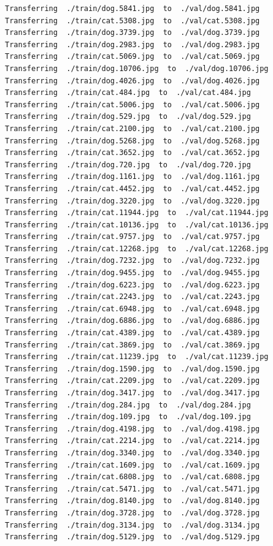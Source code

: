 \documentclass[]{book}
\theoremstyle{definition}
\theoremstyle{definition}
\theoremstyle{definition}
\theoremstyle{remark}
\begin{document}
\begin{verbatim}
Transferring  ./train/dog.5841.jpg  to  ./val/dog.5841.jpg
Transferring  ./train/cat.5308.jpg  to  ./val/cat.5308.jpg
Transferring  ./train/dog.3739.jpg  to  ./val/dog.3739.jpg
Transferring  ./train/dog.2983.jpg  to  ./val/dog.2983.jpg
Transferring  ./train/cat.5069.jpg  to  ./val/cat.5069.jpg
Transferring  ./train/dog.10706.jpg  to  ./val/dog.10706.jpg
Transferring  ./train/dog.4026.jpg  to  ./val/dog.4026.jpg
Transferring  ./train/cat.484.jpg  to  ./val/cat.484.jpg
Transferring  ./train/cat.5006.jpg  to  ./val/cat.5006.jpg
Transferring  ./train/dog.529.jpg  to  ./val/dog.529.jpg
Transferring  ./train/cat.2100.jpg  to  ./val/cat.2100.jpg
Transferring  ./train/dog.5268.jpg  to  ./val/dog.5268.jpg
Transferring  ./train/cat.3652.jpg  to  ./val/cat.3652.jpg
Transferring  ./train/dog.720.jpg  to  ./val/dog.720.jpg
Transferring  ./train/dog.1161.jpg  to  ./val/dog.1161.jpg
Transferring  ./train/cat.4452.jpg  to  ./val/cat.4452.jpg
Transferring  ./train/dog.3220.jpg  to  ./val/dog.3220.jpg
Transferring  ./train/cat.11944.jpg  to  ./val/cat.11944.jpg
Transferring  ./train/cat.10136.jpg  to  ./val/cat.10136.jpg
Transferring  ./train/cat.9757.jpg  to  ./val/cat.9757.jpg
Transferring  ./train/cat.12268.jpg  to  ./val/cat.12268.jpg
Transferring  ./train/dog.7232.jpg  to  ./val/dog.7232.jpg
Transferring  ./train/dog.9455.jpg  to  ./val/dog.9455.jpg
Transferring  ./train/dog.6223.jpg  to  ./val/dog.6223.jpg
Transferring  ./train/cat.2243.jpg  to  ./val/cat.2243.jpg
Transferring  ./train/cat.6948.jpg  to  ./val/cat.6948.jpg
Transferring  ./train/dog.6886.jpg  to  ./val/dog.6886.jpg
Transferring  ./train/cat.4389.jpg  to  ./val/cat.4389.jpg
Transferring  ./train/cat.3869.jpg  to  ./val/cat.3869.jpg
Transferring  ./train/cat.11239.jpg  to  ./val/cat.11239.jpg
Transferring  ./train/dog.1590.jpg  to  ./val/dog.1590.jpg
Transferring  ./train/cat.2209.jpg  to  ./val/cat.2209.jpg
Transferring  ./train/dog.3417.jpg  to  ./val/dog.3417.jpg
Transferring  ./train/dog.284.jpg  to  ./val/dog.284.jpg
Transferring  ./train/dog.109.jpg  to  ./val/dog.109.jpg
Transferring  ./train/dog.4198.jpg  to  ./val/dog.4198.jpg
Transferring  ./train/cat.2214.jpg  to  ./val/cat.2214.jpg
Transferring  ./train/dog.3340.jpg  to  ./val/dog.3340.jpg
Transferring  ./train/cat.1609.jpg  to  ./val/cat.1609.jpg
Transferring  ./train/cat.6808.jpg  to  ./val/cat.6808.jpg
Transferring  ./train/cat.5471.jpg  to  ./val/cat.5471.jpg
Transferring  ./train/dog.8140.jpg  to  ./val/dog.8140.jpg
Transferring  ./train/dog.3728.jpg  to  ./val/dog.3728.jpg
Transferring  ./train/dog.3134.jpg  to  ./val/dog.3134.jpg
Transferring  ./train/dog.5129.jpg  to  ./val/dog.5129.jpg

\end{verbatim}
\end{document}
